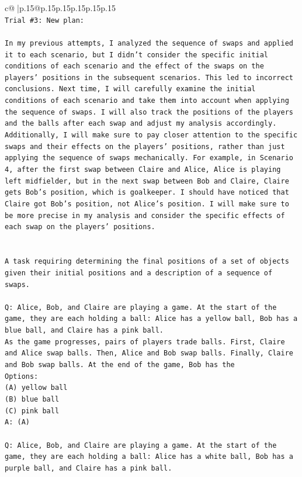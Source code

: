 \documentclass{article}
\begin{document}
{\begin{supertabular}{c@{$\;$}|p{.15\linewidth}@{}p{.15\linewidth}p{.15\linewidth}p{.15\linewidth}p{.15\linewidth}p{.15\linewidth}}
{{{\\ 
\texttt{Trial \#3: New plan: } \\
\\ 
\texttt{In my previous attempts, I analyzed the sequence of swaps and applied it to each scenario, but I didn't consider the specific initial conditions of each scenario and the effect of the swaps on the players' positions in the subsequent scenarios. This led to incorrect conclusions. Next time, I will carefully examine the initial conditions of each scenario and take them into account when applying the sequence of swaps. I will also track the positions of the players and the balls after each swap and adjust my analysis accordingly. Additionally, I will make sure to pay closer attention to the specific swaps and their effects on the players' positions, rather than just applying the sequence of swaps mechanically. For example, in Scenario 4, after the first swap between Claire and Alice, Alice is playing left midfielder, but in the next swap between Bob and Claire, Claire gets Bob's position, which is goalkeeper. I should have noticed that Claire got Bob's position, not Alice's position. I will make sure to be more precise in my analysis and consider the specific effects of each swap on the players' positions.} \\
\\ 
\\ 
\texttt{A task requiring determining the final positions of a set of objects given their initial positions and a description of a sequence of swaps.} \\
\\ 
\texttt{Q: Alice, Bob, and Claire are playing a game. At the start of the game, they are each holding a ball: Alice has a yellow ball, Bob has a blue ball, and Claire has a pink ball.} \\
\texttt{As the game progresses, pairs of players trade balls. First, Claire and Alice swap balls. Then, Alice and Bob swap balls. Finally, Claire and Bob swap balls. At the end of the game, Bob has the} \\
\texttt{Options:} \\
\texttt{(A) yellow ball} \\
\texttt{(B) blue ball} \\
\texttt{(C) pink ball} \\
\texttt{A: (A)} \\
\\ 
\texttt{Q: Alice, Bob, and Claire are playing a game. At the start of the game, they are each holding a ball: Alice has a white ball, Bob has a purple ball, and Claire has a pink ball.} \\
}}}
\end{supertabular}}
\end{document}
